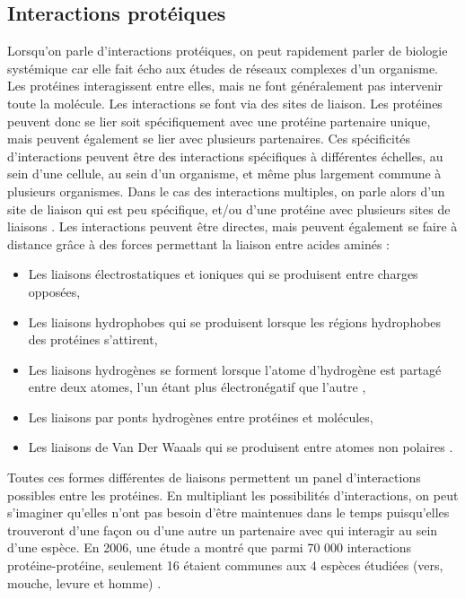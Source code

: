 \subsection{Interactions protéiques} \label{intprot}
\par Lorsqu’on parle d’interactions protéiques, on peut rapidement parler de biologie systémique car elle fait écho aux études de réseaux complexes d’un organisme. Les protéines interagissent entre elles, mais ne font généralement pas intervenir toute la molécule. Les interactions se font via des sites de liaison. Les protéines peuvent donc se lier soit spécifiquement avec une protéine partenaire unique, mais peuvent également se lier avec plusieurs partenaires. Ces spécificités d’interactions peuvent être des interactions spécifiques à différentes échelles, au sein d’une cellule, au sein d’un organisme, et même plus largement commune à plusieurs organismes. Dans le cas des interactions multiples, on parle alors d’un site de liaison qui est peu spécifique, et/ou d’une protéine avec plusieurs sites de liaisons \parencite{di_lullo_mapping_2002}. Les interactions peuvent être directes, mais peuvent également se faire à distance grâce à des forces permettant la liaison entre acides aminés : 
\begin{itemize}
    \item Les liaisons électrostatiques et ioniques qui se produisent entre charges opposées,
    \item Les liaisons hydrophobes qui se produisent lorsque les régions hydrophobes des protéines s’attirent, 
    \item Les liaisons hydrogènes se forment lorsque l'atome d'hydrogène est partagé entre deux atomes, l'un étant plus électronégatif que l'autre  \parencite{bondar_hydrogen_2012},
    \item Les liaisons par ponts hydrogènes entre protéines et molécules, 
    \item Les liaisons de Van Der Waaals qui se produisent entre atomes non polaires  \parencite{van_oss_role_1986}.
\end{itemize}
\par Toutes ces formes différentes de liaisons permettent un panel d’interactions possibles entre les protéines. En multipliant les possibilités d’interactions, on peut s’imaginer qu’elles n’ont pas besoin d’être maintenues dans le temps puisqu’elles trouveront d’une façon ou d’une autre un partenaire avec qui interagir au sein d’une espèce. En 2006, une étude a montré que parmi 70 000 interactions protéine-protéine, seulement 16 étaient communes aux 4 espèces étudiées (vers, mouche, levure et homme) \parencite{gandhi_analysis_2006}. 

